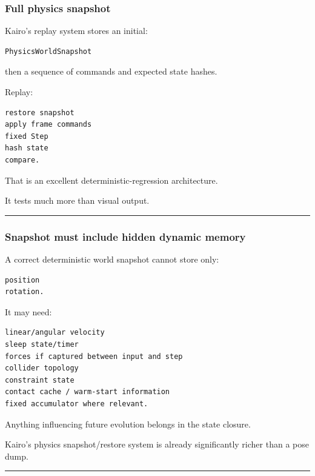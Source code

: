 \subsubsection{Full physics snapshot}\label{full-physics-snapshot}

Kairo's replay system stores an initial:

\begin{verbatim}
PhysicsWorldSnapshot
\end{verbatim}

then a sequence of commands and expected state hashes.

Replay:

\begin{verbatim}
restore snapshot
apply frame commands
fixed Step
hash state
compare.
\end{verbatim}

That is an excellent deterministic-regression architecture.

It tests much more than visual output.

\begin{center}\rule{0.5\linewidth}{0.5pt}\end{center}

\subsubsection{Snapshot must include hidden dynamic memory}\label{snapshot-must-include-hidden-dynamic-memory}

A correct deterministic world snapshot cannot store only:

\begin{verbatim}
position
rotation.
\end{verbatim}

It may need:

\begin{verbatim}
linear/angular velocity
sleep state/timer
forces if captured between input and step
collider topology
constraint state
contact cache / warm-start information
fixed accumulator where relevant.
\end{verbatim}

Anything influencing future evolution belongs in the state closure.

Kairo's physics snapshot/restore system is already significantly richer than a pose dump.

\begin{center}\rule{0.5\linewidth}{0.5pt}\end{center}


